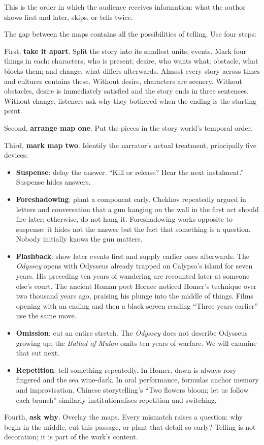 This is the order in which the audience receives information: what the author shows first and later, skips, or tells twice.

The gap between the maps contains all the possibilities of telling. Use four steps:

First, \textbf{take it apart}. Split the story into its smallest units, events. Mark four things in each: characters, who is present; desire, who wants what; obstacle, what blocks them; and change, what differs afterwards. Almost every story across times and cultures contains these. Without desire, characters are scenery. Without obstacles, desire is immediately satisfied and the story ends in three sentences. Without change, listeners ask why they bothered when the ending is the starting point.

Second, \textbf{arrange map one}. Put the pieces in the story world's temporal order.

Third, \textbf{mark map two}. Identify the narrator's actual treatment, principally five devices:

\begin{itemize}
\item \textbf{Suspense}: delay the answer. ``Kill or release? Hear the next instalment.'' Suspense hides answers.
\item \textbf{Foreshadowing}: plant a component early. Chekhov repeatedly argued in letters and conversation that a gun hanging on the wall in the first act should fire later; otherwise, do not hang it. Foreshadowing works opposite to suspense: it hides not the answer but the fact that something is a question. Nobody initially knows the gun matters.
\item \textbf{Flashback}: show later events first and supply earlier ones afterwards. The \emph{Odyssey} opens with Odysseus already trapped on Calypso's island for seven years. His preceding ten years of wandering are recounted later at someone else's court. The ancient Roman poet Horace noticed Homer's technique over two thousand years ago, praising his plunge into the middle of things. Films opening with an ending and then a black screen reading ``Three years earlier'' use the same move.
\item \textbf{Omission}: cut an entire stretch. The \emph{Odyssey} does not describe Odysseus growing up; the \emph{Ballad of Mulan} omits ten years of warfare. We will examine that cut next.
\item \textbf{Repetition}: tell something repeatedly. In Homer, dawn is always rosy-fingered and the sea wine-dark. In oral performance, formulas anchor memory and improvisation. Chinese storytelling's ``Two flowers bloom; let us follow each branch'' similarly institutionalises repetition and switching.
\end{itemize}
Fourth, \textbf{ask why}. Overlay the maps. Every mismatch raises a question: why begin in the middle, cut this passage, or plant that detail so early? Telling is not decoration; it is part of the work's content.


